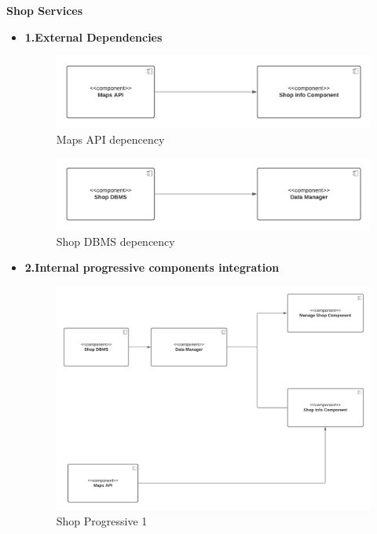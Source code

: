 \textbf{Shop Services}
\begin{itemize}
    \item \textbf{1.External Dependencies}
    \begin{figure}[h!]
        \centering
        \includegraphics[width=1\textwidth]{Images/Test Diagram/Shop/maps.png}
        \caption{\label{fig:ShopExternalDepMAPS}{Maps API depencency}}
    \end{figure}  
    
    \begin{figure}[h!]
        \centering
        \includegraphics[width=1\textwidth]{Images/Test Diagram/Shop/data.png}
        \caption{\label{fig:ShopExternalDepDBMS}{Shop DBMS depencency}}
    \end{figure}
    \item \textbf{2.Internal progressive components integration} 
    \begin{figure}[h!]
        \centering
        \includegraphics[width=1\textwidth]{Images/Test Diagram/Shop/2Shop (1).png}
        \caption{\label{fig:Shopinternal}{Shop Progressive 1}}
    \end{figure}  
\end{itemize}

